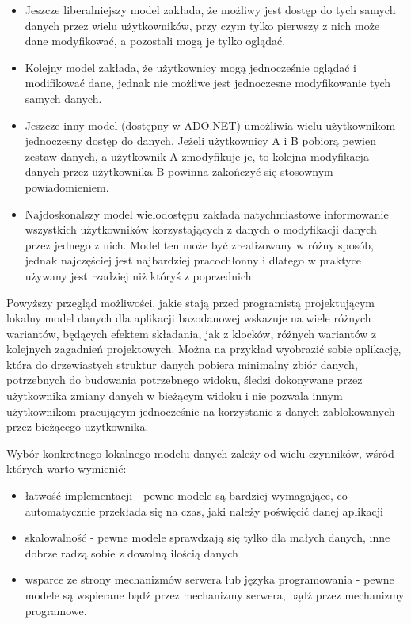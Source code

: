 \begin{description}
\begin{itemize}
	\item Jeszcze liberalniejszy model zakłada, że możliwy jest dostęp do tych samych danych przez
	wielu użytkowników, przy czym tylko pierwszy z nich może dane modyfikować, a pozostali mogą
	je tylko oglądać.

	\item Kolejny model zakłada, że użytkownicy mogą jednocześnie oglądać i modifikować dane,
	jednak nie możliwe jest jednoczesne modyfikowanie tych samych danych.

	\item Jeszcze inny model (dostępny w ADO.NET) umożliwia wielu użytkownikom jednoczesny dostęp do danych.
	Jeżeli użytkownicy A i B pobiorą pewien zestaw danych, a użytkownik A zmodyfikuje je, to 
	kolejna modyfikacja danych przez użytkownika B powinna zakończyć się stosownym powiadomieniem.
	
	\item Najdoskonalszy model wielodostępu zakłada natychmiastowe informowanie wszystkich użytkowników
	korzystających z danych o modyfikacji danych przez jednego z nich. Model ten może być zrealizowany
	w różny sposób, jednak najczęściej jest najbardziej pracochłonny i dlatego w praktyce
	używany jest rzadziej niż któryś z poprzednich.
	\end{itemize}

\end{description}

Powyższy przegląd możliwości, jakie stają przed programistą projektującym lokalny model
danych dla aplikacji bazodanowej wskazuje na wiele różnych wariantów, będących
efektem składania, jak z klocków, różnych wariantów z kolejnych zagadnień projektowych. Można na
przykład wyobrazić sobie aplikację, która do drzewiastych struktur danych pobiera minimalny zbiór
danych, potrzebnych do budowania potrzebnego widoku, śledzi dokonywane przez użytkownika zmiany danych
w bieżącym widoku i nie pozwala innym użytkownikom pracującym jednocześnie na korzystanie z 
danych zablokowanych przez bieżącego użytkownika.

Wybór konkretnego lokalnego modelu danych zależy od wielu czynników, wśród których warto wymienić:
\begin{itemize}
\item łatwość implementacji - pewne modele są bardziej wymagające, co automatycznie przekłada się na
czas, jaki należy poświęcić danej aplikacji
\item skalowalność - pewne modele sprawdzają się tylko dla małych danych, inne dobrze radzą sobie
z dowolną ilością danych
\item wsparce ze strony mechanizmów serwera lub języka programowania - pewne modele są wspierane
bądź przez mechanizmy serwera, bądź przez mechanizmy programowe. 
\end{itemize}

